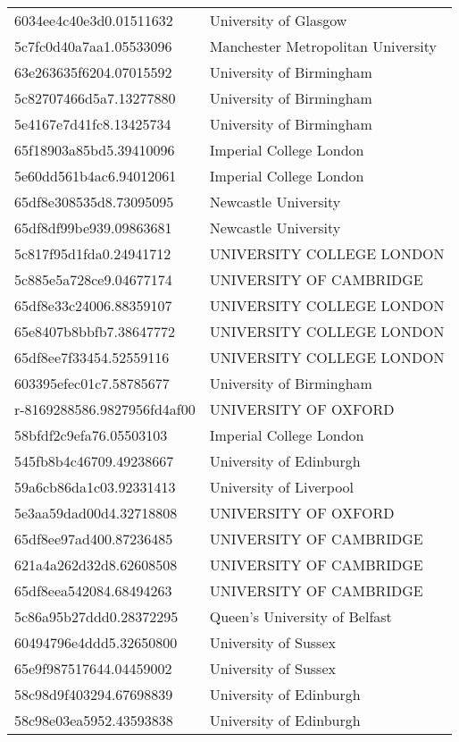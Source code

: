 \begin{tabular}{ll}
6034ee4c40e3d0.01511632 & University of Glasgow \\
5c7fc0d40a7aa1.05533096 & Manchester Metropolitan University \\
63e263635f6204.07015592 & University of Birmingham \\
5c82707466d5a7.13277880 & University of Birmingham \\
5e4167e7d41fc8.13425734 & University of Birmingham \\
65f18903a85bd5.39410096 & Imperial College London \\
5e60dd561b4ac6.94012061 & Imperial College London \\
65df8e308535d8.73095095 & Newcastle University \\
65df8df99be939.09863681 & Newcastle University \\
5c817f95d1fda0.24941712 & UNIVERSITY COLLEGE LONDON \\
5c885e5a728ce9.04677174 & UNIVERSITY OF CAMBRIDGE \\
65df8e33c24006.88359107 & UNIVERSITY COLLEGE LONDON \\
65e8407b8bbfb7.38647772 & UNIVERSITY COLLEGE LONDON \\
65df8ee7f33454.52559116 & UNIVERSITY COLLEGE LONDON \\
603395efec01c7.58785677 & University of Birmingham \\
r-8169288586.9827956fd4af00 & UNIVERSITY OF OXFORD \\
58bfdf2c9efa76.05503103 & Imperial College London \\
545fb8b4c46709.49238667 & University of Edinburgh \\
59a6cb86da1c03.92331413 & University of Liverpool \\
5e3aa59dad00d4.32718808 & UNIVERSITY OF OXFORD \\
65df8ee97ad400.87236485 & UNIVERSITY OF CAMBRIDGE \\
621a4a262d32d8.62608508 & UNIVERSITY OF CAMBRIDGE \\
65df8eea542084.68494263 & UNIVERSITY OF CAMBRIDGE \\
5c86a95b27ddd0.28372295 & Queen's University of Belfast \\
60494796e4ddd5.32650800 & University of Sussex \\
65e9f987517644.04459002 & University of Sussex \\
58c98d9f403294.67698839 & University of Edinburgh \\
58c98e03ea5952.43593838 & University of Edinburgh \\

\end{tabular}
